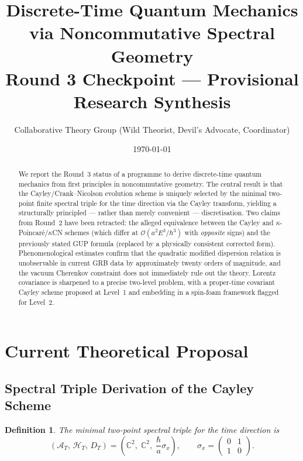 \documentclass[11pt,a4paper]{article}
\title{\textbf{Discrete-Time Quantum Mechanics via Noncommutative Spectral Geometry}\\[0.4em]
\large Round 3 Checkpoint --- Provisional Research Synthesis}
\author{Collaborative Theory Group (Wild Theorist, Devil's Advocate, Coordinator)}
\date{\today}
\newtheorem{definition}{Definition}
\begin{document}
\maketitle

\begin{abstract}
We report the Round~3 status of a programme to derive discrete-time quantum mechanics from first principles in noncommutative geometry. The central result is that the Cayley/Crank--Nicolson evolution scheme is uniquely selected by the minimal two-point finite spectral triple for the time direction via the Cayley transform, yielding a structurally principled --- rather than merely convenient --- discretisation. Two claims from Round~2 have been retracted: the alleged equivalence between the Cayley and $\kappa$-Poincar\'{e}/\allowbreak$\kappa$CN schemes (which differ at $\mathcal{O}(a^2 E^3/\hbar^3)$ with \emph{opposite} signs) and the previously stated GUP formula (replaced by a physically consistent corrected form). Phenomenological estimates confirm that the quadratic modified dispersion relation is unobservable in current GRB data by approximately twenty orders of magnitude, and the vacuum Cherenkov constraint does not immediately rule out the theory. Lorentz covariance is sharpened to a precise two-level problem, with a proper-time covariant Cayley scheme proposed at Level~1 and embedding in a spin-foam framework flagged for Level~2.
\end{abstract}

\tableofcontents
\vspace{1em}

\section{Current Theoretical Proposal}

\subsection{Spectral Triple Derivation of the Cayley Scheme}

\begin{definition}
The \emph{minimal two-point spectral triple for the time direction} is
\begin{equation}\label{eq:1}
  (\mathcal{A}_T,\,\mathcal{H}_T,\,D_T)
  = \!\left(\mathbb{C}^2,\;\mathbb{C}^2,\;\frac{\hbar}{a}\sigma_x\right),
  \qquad
  \sigma_x = \begin{pmatrix}0&1\\1&0\end{pmatrix}.
\end{equation}
\end{definition}
\end{document}
